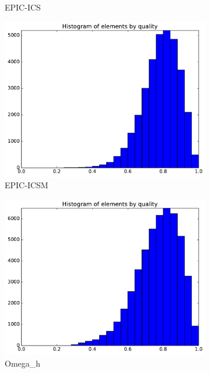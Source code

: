 \documentclass[3p,times,procedia,number]{elsarticle}
\begin{document}
\begin{figure}
\begin{subfigure}{.16\textwidth}
\caption{EPIC-ICS}
\end{subfigure}
\begin{subfigure}{.16\textwidth}
\centering
\includegraphics[width=\textwidth]{epic-icsm-cube-cylinder-polar-2-quality.pdf}
\caption{EPIC-ICSM}
\end{subfigure}
\begin{subfigure}{.16\textwidth}
\centering
\includegraphics[width=\textwidth]{omega_h-cube-cylinder-polar-2-quality.pdf}
\caption{Omega\_h}
\end{subfigure}
\begin{subfigure}{.16\textwidth}
\centering

\end{subfigure}
\end{figure}
\end{document}
